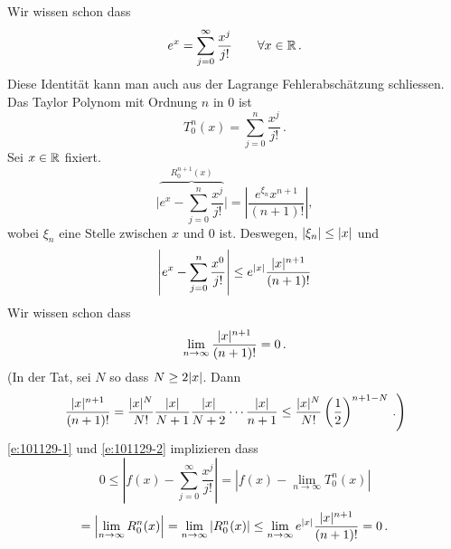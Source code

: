 \begin{Bsp} Wir wissen schon dass
  \[e^x=\sum^\infty_{j=0}\frac{x^j}{j!}\qquad\forall x\in\mathbb{R}\, .\]
Diese Identit\"at kann man auch aus der Lagrange Fehlerabsch\"atzung
schliessen. Das Taylor Polynom mit Ordnung $n$ in $0$ ist 
\[T_0^n(x)=\sum^n_{j=0}\frac{x^j}{j!}\, .\]
Sei $x\in\mathbb{R}$ fixiert. 
  \[\Bigg|\overbrace{e^x-\sum_{j=0}^{n}\frac{x^j}{j!}}^{R^{n+1}_0 (x)}\Bigg|=
\left|\frac{e^{\xi_n}x^{n+1}}{(n+1)!}\right|,\]
wobei $\xi_n$ eine Stelle zwischen $x$ und $0$ ist. 
Deswegen, $\mathopen| \xi_n \mathclose|\leq \mathopen| x \mathclose|$ und
\begin{equation}\label{e:101129-1}
\left|e^x-\sum_{j=0}^{n}\frac{x^0}{j!}\right|\leq e^{|x|}\frac{\mathopen| x \mathclose|^{n+1}}{(n+1)!}
\end{equation}
Wir wissen schon dass
\begin{equation}\label{e:101129-2}
\displaystyle\lim_{n\rightarrow\infty}\frac{\mathopen| x \mathclose|^{n+1}}{(n+1)!}=0\, .
\end{equation}
(In der Tat, sei $N$ so dass $N\geq 2\mathopen| x \mathclose|$. Dann
 \[\left.\frac{\mathopen| x \mathclose|^{n+1}}{(n+1)!} = \frac{\mathopen| x \mathclose|^N}{N!}
\frac{\mathopen| x \mathclose|}{N+1}\frac{\mathopen| x \mathclose|}{N+2}\cdots\frac{\mathopen| x \mathclose|}{n+1}
\leq \frac{\mathopen| x \mathclose|^N}{N!}\left(\frac{1}{2} \right)^{n+1-N}\, .\right)\]
\eqref{e:101129-1} und \eqref{e:101129-2} implizieren dass
\[
0 \leq \left|f(x) - \sum_{j=0}^\infty \frac{x^j}{j!}\right|
= \left|f (x) - \lim_{n\to\infty} T^n_0 (x)\right| 
\]
\[
= \left|\lim_{n\to\infty} R^n_0 (x)\right|
= \lim_{n\to \infty} |R^n_0 (x)| \leq \lim_{n\to\infty}
 e^{|x|}\frac{\mathopen| x \mathclose|^{n+1}}{(n+1)!} = 0\, .
\]
\end{Bsp}
